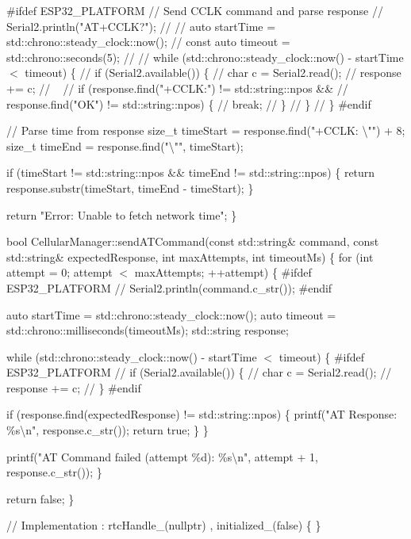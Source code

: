 \#ifdef ESP32\+\_\+\+PLATFORM // Send CCLK command and parse response // Serial2.\+println("{}\+AT+\+CCLK?"{}); // // auto start\+Time = std\+::chrono\+::steady\+\_\+clock\+::now(); // const auto timeout = std\+::chrono\+::seconds(5); // // while (std\+::chrono\+::steady\+\_\+clock\+::now() -\/ start\+Time \texorpdfstring{$<$}{<} timeout) \{ // if (Serial2.\+available()) \{ // char c = Serial2.\+read(); // response += c; // ~\newline
 // if (response.\+find("{}+\+CCLK\+:"{}) != std\+::string\+::npos \&\& // response.\+find("{}\+OK"{}) != std\+::string\+::npos) \{ // break; // \} // \} // \} \#endif

// Parse time from response size\+\_\+t time\+Start = response.\+find("{}+\+CCLK\+: \textbackslash{}"{}"{}) + 8; size\+\_\+t time\+End = response.\+find("{}\textbackslash{}"{}"{}, time\+Start);

if (time\+Start != std\+::string\+::npos \&\& time\+End != std\+::string\+::npos) \{ return response.\+substr(time\+Start, time\+End -\/ time\+Start); \}

return "{}\+Error\+: Unable to fetch network time"{}; \}

bool Cellular\+Manager\+::send\+ATCommand(const std\+::string\& command,                                     const std\+::string\& expected\+Response,                                     int max\+Attempts, int timeout\+Ms) \{ for (int attempt = 0; attempt \texorpdfstring{$<$}{<} max\+Attempts; ++attempt) \{ \#ifdef ESP32\+\_\+\+PLATFORM // Serial2.\+println(command.\+c\+\_\+str()); \#endif

auto start\+Time = std\+::chrono\+::steady\+\_\+clock\+::now(); auto timeout = std\+::chrono\+::milliseconds(timeout\+Ms); std\+::string response;

while (std\+::chrono\+::steady\+\_\+clock\+::now() -\/ start\+Time \texorpdfstring{$<$}{<} timeout) \{ \#ifdef ESP32\+\_\+\+PLATFORM // if (Serial2.\+available()) \{ // char c = Serial2.\+read(); // response += c; // \} \#endif

if (response.\+find(expected\+Response) != std\+::string\+::npos) \{ printf("{}\+AT Response\+: \%s\textbackslash{}n"{}, response.\+c\+\_\+str()); return true; \} \}

printf("{}\+AT Command failed (attempt \%d)\+: \%s\textbackslash{}n"{}, attempt + 1, response.\+c\+\_\+str()); \}

return false; \}

//  Implementation  \+: rtc\+Handle\+\_\+(nullptr) , initialized\+\_\+(false) \{ \}

